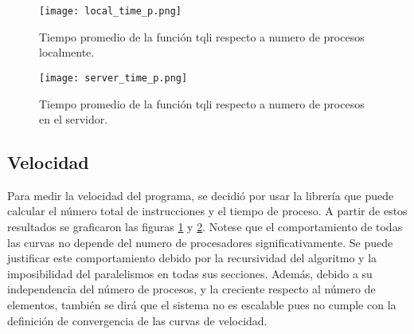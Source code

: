 \begin{figure}
	\centering
	\texttt{[image: local\_time\_p.png]}
	\caption{Tiempo promedio de la función tqli respecto a numero de procesos localmente.}
	\label{fig:local_time_p}
\end{figure}
\begin{figure}
	\centering
	\texttt{[image: server\_time\_p.png]}
	\caption{Tiempo promedio de la función tqli respecto a numero de procesos en el servidor.}
	\label{fig:server_time_p}
\end{figure}





	      	          


\subsection{Velocidad}
Para medir la velocidad del programa, se decidió por usar la librería  que puede calcular el número total de instrucciones y el tiempo de proceso. A partir de estos resultados se graficaron las figuras \ref{fig:local_time_p} y \ref{fig:server_time_p}. Notese que el comportamiento de todas las curvas no depende del numero de procesadores significativamente. Se puede justificar este comportamiento debido por la recursividad del algoritmo y la imposibilidad del paralelismos en todas sus secciones. Además, debido a su independencia del número de procesos, y la creciente respecto al número de elementos, también se dirá que el sistema no es escalable pues no cumple con la definición de convergencia de las curvas de velocidad.



